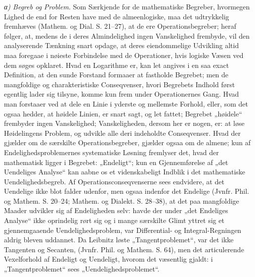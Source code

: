 \documentclass[12pt,a4paper]{book}
\begin{document}
\emph{α) Begreb og Problem.} Som Særkjende for de
mathematiske Begreber, hvormegen Lighed de end for Resten
have med de almeenlogiske, maa det udtrykkelig fremhæves
(Mathem. og Dial. S. 21--27), at de ere Operationsbegreber;
heraf følger, at, medens de i deres Almindelighed ingen
Vanskelighed frembyde, vil den analyserende Tænkning snart
opdage, at deres eiendommelige Udvikling altid maa foregaae
i nøieste Forbindelse med de Operationer, hvis logiske Væsen
ved dem søges opklaret. Hvad en Logarithme er, kan let
angives i en saa exact Definition, at den sunde Forstand
formaaer at fastholde Begrebet; men de mangfoldige og
charakteristiske Conseqvenser, hvori Begrebets Indhold først egentlig
lader sig tilsyne, komme kun frem under Operationernes
Gang. Hvad man forstaaer ved at dele en Linie i yderste
og mellemste Forhold, eller, som det ogsaa hedder, at høidele
Linien, er snart sagt, og let fattet; Begrebet „høidele“ frembyder
ingen Vanskelighed; Vanskeligheden, dersom her er nogen,
er: at løse Høidelingens Problem, og udvikle alle deri indeholdte
Conseqvenser. Hvad der gjælder om de særskilte Operationsbegreber,
gjælder ogsaa om de almene; kun af Endelighedsproblemernes
systematiske Løsning fremlyser det, hvad der
mathematisk ligger i Begrebet: „Endeligt“; kun en Gjennemførelse
af „det Uendeliges Analyse“ kan aabne os et videnskabeligt
Indblik i det mathematiske Uendelighedsbegreb. Af
Operationsconseqvenserne sees endvidere, at det Uendelige ikke blot
falder udenfor, men ogsaa indenfor det Endelige (Jvnfr. Phil.
og Mathem. S. 20--24; Mathem. og Dialekt. S. 28--38),
at det paa mangfoldige Maader udvikler sig af Endeligheden
selv: havde der under „det Endeliges Analyse“ ikke oprindelig
rørt sig og i mange særskilte Glimt yttret sig et gjennemgaaende
Uendelighedsproblem, var Differential- og Integral-Regningen
aldrig bleven uddannet. Da Leibnitz løste „Tangentproblemet“,
var det ikke Tangenten og Secanten, (Jvnfr. Phil. og Mathem.
S. 64), men det articulerende Vexelforhold af Endeligt og
Uendeligt, hvorom det væsentlig gjaldt: i „Tangentproblemet“
sees „Uendelighedsproblemet“.
\end{document}
